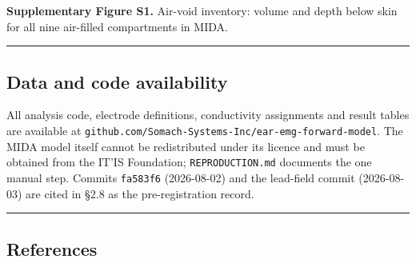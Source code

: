\documentclass[
  11pt,
]{article}
\begin{document}
\textbf{Supplementary Figure S1.} Air-void inventory: volume and depth below skin for
all nine air-filled compartments in MIDA.

\begin{center}\rule{0.5\linewidth}{0.5pt}\end{center}

\FloatBarrier
\subsection{Data and code availability}\label{data-and-code-availability}

All analysis code, electrode definitions, conductivity assignments and result
tables are available at \texttt{github.com/Somach-Systems-Inc/ear-emg-forward-model}.
The MIDA model itself cannot be redistributed under its licence and must be
obtained from the IT'IS Foundation; \texttt{REPRODUCTION.md} documents the one manual
step. Commits \texttt{fa583f6} (2026-08-02) and the lead-field commit (2026-08-03) are
cited in §2.8 as the pre-registration record.

\begin{center}\rule{0.5\linewidth}{0.5pt}\end{center}

\FloatBarrier
\subsection{References}\label{references}
\end{document}
